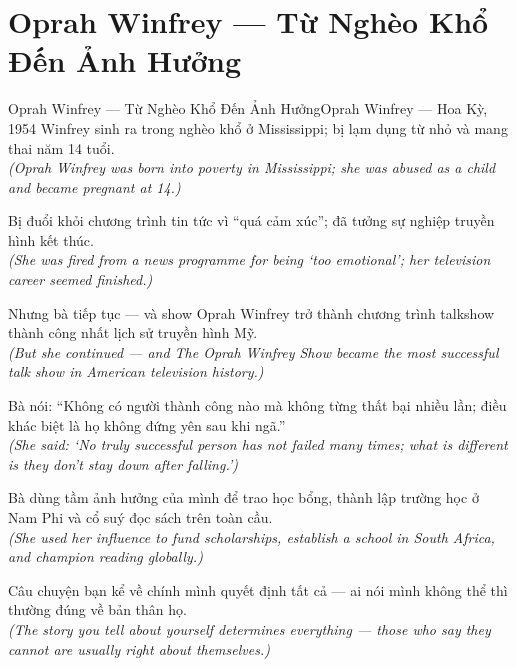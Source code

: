 \section{Oprah Winfrey --- Từ Nghèo Khổ Đến Ảnh Hưởng}
\begin{truyen}{Oprah Winfrey --- Từ Nghèo Khổ Đến Ảnh Hưởng}{Oprah Winfrey --- Hoa Kỳ, 1954}
 Winfrey sinh ra trong nghèo khổ ở Mississippi; bị lạm dụng từ nhỏ và mang thai năm 14 tuổi.\\[4pt]
\textit{(Oprah Winfrey was born into poverty in Mississippi; she was abused as a child and became pregnant at 14.)}

Bị đuổi khỏi chương trình tin tức vì ``quá cảm xúc''; đã tưởng sự nghiệp truyền hình kết thúc.\\[4pt]
\textit{(She was fired from a news programme for being `too emotional'; her television career seemed finished.)}

Nhưng bà tiếp tục --- và show Oprah Winfrey trở thành chương trình talkshow thành công nhất lịch sử truyền hình Mỹ.\\[4pt]
\textit{(But she continued --- and The Oprah Winfrey Show became the most successful talk show in American television history.)}

Bà nói: ``Không có người thành công nào mà không từng thất bại nhiều lần; điều khác biệt là họ không đứng yên sau khi ngã.''\\[4pt]
\textit{(She said: `No truly successful person has not failed many times; what is different is they don't stay down after falling.')}

Bà dùng tầm ảnh hưởng của mình để trao học bổng, thành lập trường học ở Nam Phi và cổ suý đọc sách trên toàn cầu.\\[4pt]
\textit{(She used her influence to fund scholarships, establish a school in South Africa, and champion reading globally.)}

\end{truyen}
\begin{baihoc}
  Câu chuyện bạn kể về chính mình quyết định tất cả --- ai nói mình không thể thì thường đúng về bản thân họ.\\[4pt]
  \textit{(The story you tell about yourself determines everything --- those who say they cannot are usually right about themselves.)}
\end{baihoc}


